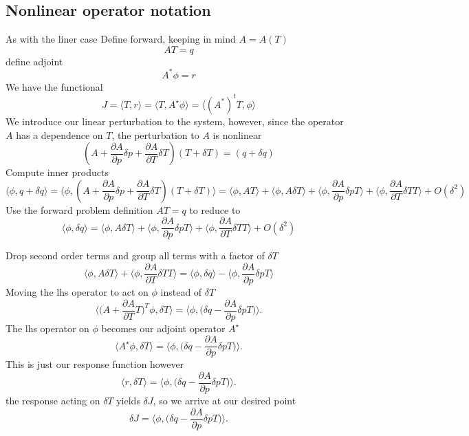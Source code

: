 \documentclass[11pt]{article}
\newcommand{\der}[2]{\frac{\partial #1}{\partial #2}}
\begin{document}
\subsection{Nonlinear operator notation}
As with the liner case Define forward, keeping in mind $A=A(T)$
\[
AT=q
\]
define adjoint
\[
A^* \phi =r
\]
We have the functional
\[
J=\langle T,r \rangle = \langle T, A^\star \phi \rangle = \langle (A^*)^t T,\phi \rangle
\]
We introduce our linear perturbation to the system, however, since the operator $A$ has a dependence on $T$, the perturbation to $A$ is nonlinear
\begin{equation}
(A+\der{A}{p} \delta p + \der{A}{T} \delta T)(T + \delta T)=(q+\delta q)
\end{equation}
Compute inner products
\begin{equation}
\langle \phi, q + \delta q \rangle = \langle \phi, (A+\der{A}{p} \delta p + \der{A}{T} \delta T)(T + \delta T) \rangle = \langle \phi , AT \rangle + \langle \phi , A \delta  T \rangle + \langle \phi , \der{A}{p} \delta p T \rangle + \langle \phi, \der{A}{T} \delta T T \rangle + O(\delta^2) 
\end{equation}
Use the forward problem definition $AT=q$ to reduce to 
\begin{equation}
\langle \phi, \delta q \rangle = \langle \phi , A \delta  T \rangle + \langle \phi , \der{A}{p} \delta p T \rangle + \langle \phi, \der{A}{T} \delta T T \rangle + O(\delta^2) 
\end{equation}

Drop second order terms and group all terms with a factor of $\delta T$
\[
\langle \phi , A \delta  T \rangle + \langle \phi, \der{A}{T} \delta T T \rangle = \langle \phi, \delta q \rangle- \langle \phi , \der{A}{p} \delta p T \rangle 
\]
Moving the lhs operator to act on $\phi$ instead of $\delta T$
\[
\langle \Big(A+\der{A}{T} T \Big)^T \phi ,  \delta T \rangle  = \langle \phi, \Big( \delta q - \der{A}{p} \delta p T \Big) \rangle.
\]
The lhs operator on $\phi$ becomes our adjoint operator $A^\star$
\[
\langle A^\star \phi ,  \delta T \rangle  = \langle \phi, \Big( \delta q - \der{A}{p} \delta p T \Big) \rangle.
\]
This is just our response function however 
\[
\langle r ,  \delta T \rangle  = \langle \phi, \Big( \delta q - \der{A}{p} \delta p T \Big) \rangle.
\]
the response acting on $\delta T$ yields $\delta J$, so we arrive at our desired point
\[
\delta J = \langle \phi, \Big( \delta q - \der{A}{p} \delta p T \Big) \rangle.
\]
\end{document}
